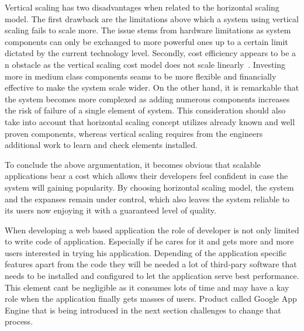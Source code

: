 Vertical scaling has two disadvantages when related to the horizontal scaling model. The first drawback are the limitations above which a system using vertical scaling fails to scale more. The issue stems from hardware limitations as system components can only be exchanged to more powerful ones up to a certain limit dictated by the current technology level. Secondly, cost efficiency appears to be a n obstacle as the vertical scaling cost model does not scale linearly~\cite[page 204]{build_scalable}. Investing more in medium class components seams to be more flexible and financially effective to make the system scale wider. On the other hand, it is remarkable that the system becomes more complexed as adding numerous components increases the risk of failure of a single element of system. This consideration should also take into account that horizontal scaling concept utilizes already known and well proven components, whereas vertical scaling requires from the engineers additional work to learn and check elements installed.

To conclude the above argumentation, it becomes obvious that scalable applications bear a cost which allows their developers feel confident in case the system will gaining popularity. By choosing horizontal scaling model, the system and the expanses remain under control, which also leaves the system reliable to its users now enjoying it with a guaranteed level of quality. 

When developing a web based application the role of developer is not only limited to write code of application. Especially  if he cares for it and gets more and more users interested in trying his application. Depending of the application specific features apart from the code they will be needed a lot of third-pary software that needs to be installed and configured to let the application serve best performance. This element cant be negligible  as it consumes lots of time and may have a kay role when the application finally gets masses of users. Product called Google App Engine that is being introduced in the next section challenges to change that process.  
 
